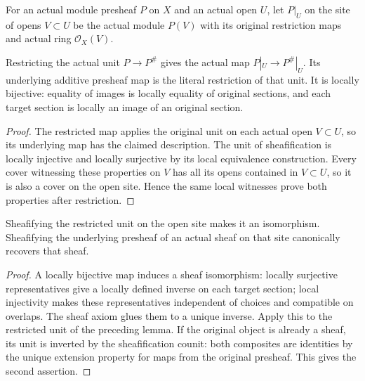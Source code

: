 \begin{definition}
\label{sc0-canonical-port:geom:module-presheaf-over-open}
\leanok
For an actual module presheaf \(P\) on \(X\) and an
actual open \(U\), let \(P|_U\) on the site of opens
\(V\subset U\) be the actual module \(P(V)\) with its
original restriction maps and actual ring \(\mathcal O_X(V)\).
\end{definition}

\begin{lemma}
\label{sc0-canonical-port:geom:restricted-sheafification-unit}
\leanok
Restricting the actual unit \(P\to P^\#\) gives the
actual map \(P|_U\to P^\#|_U\). Its underlying additive
presheaf map is the literal restriction of that unit.
It is locally bijective: equality of images is locally
equality of original sections, and each target section is
locally an image of an original section.
\end{lemma}
\begin{proof}
The restricted map applies the original unit on each actual
open \(V\subset U\), so its underlying map has the
claimed description. The unit of sheafification is locally
injective and locally surjective by its local equivalence
construction. Every cover witnessing these properties on
\(V\) has all its opens contained in \(V\subset U\),
so it is also a cover on the open site. Hence the same
local witnesses prove both properties after restriction.
\end{proof}

\begin{lemma}
\label{sc0-canonical-port:geom:open-site-unit-inversion}
\leanok
Sheafifying the restricted unit on the open site makes it
an isomorphism. Sheafifying the underlying presheaf of an
actual sheaf on that site canonically recovers that sheaf.
\end{lemma}
\begin{proof}
A locally bijective map induces a sheaf isomorphism:
locally surjective representatives give a locally defined
inverse on each target section; local injectivity makes
these representatives independent of choices and compatible
on overlaps. The sheaf axiom glues them to a unique inverse.
Apply this to the restricted unit of the preceding lemma.
If the original object is already a sheaf, its unit is
inverted by the sheafification counit: both composites
are identities by the unique extension property for maps
from the original presheaf. This gives the second assertion.
\end{proof}

